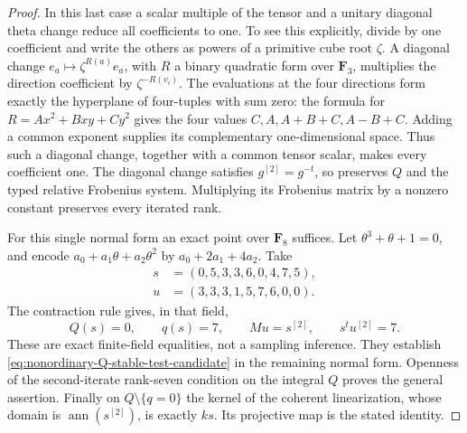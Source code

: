 \begin{proof}
In this last case a scalar multiple of the tensor and a unitary
diagonal theta change reduce all coefficients to one. To see this
explicitly, divide by one coefficient and write the others as powers
of a primitive cube root $\zeta$. A diagonal change
$e_a\mapsto\zeta^{R(a)}e_a$, with $R$ a binary quadratic form over
$\mathbf F_3$, multiplies the direction coefficient by
$\zeta^{-R(v_i)}$. The evaluations at the four directions form exactly
the hyperplane of four-tuples with sum zero: the formula for
$R=Ax^2+Bxy+Cy^2$ gives the four values
$C,A,A+B+C,A-B+C$. Adding a common exponent supplies its complementary
one-dimensional space. Thus such a diagonal change, together with a
common tensor scalar, makes every coefficient one. The diagonal change
satisfies $g^{[2]}=g^{-t}$, so preserves $Q$ and the typed relative
Frobenius system. Multiplying its Frobenius matrix by a nonzero
constant preserves every iterated rank.

For this single normal form an exact point over $\mathbf F_8$ suffices.
Let $\theta^3+\theta+1=0$, and encode
$a_0+a_1\theta+a_2\theta^2$ by $a_0+2a_1+4a_2$.
Take
\[
 \begin{split}
 s&=(0,5,3,3,6,0,4,7,5),\\
 u&=(3,3,3,1,5,7,6,0,0).
 \end{split}
\]
The contraction rule gives, in that field,
\[
        Q(s)=0,\qquad q(s)=7,\qquad Mu=s^{[2]},
                         \qquad s^tu^{[2]}=7.
\]
These are exact finite-field equalities, not a sampling inference.
They establish \eqref{eq:nonordinary-Q-stable-test-candidate} in the
remaining normal form. Openness of the second-iterate rank-seven
condition on the integral $Q$ proves the general assertion.
Finally on $Q\setminus\{q=0\}$ the kernel of the coherent
linearization, whose domain is $\operatorname{ann}(s^{[2]})$,
is exactly $ks$. Its projective map is the stated identity.
\end{proof}

